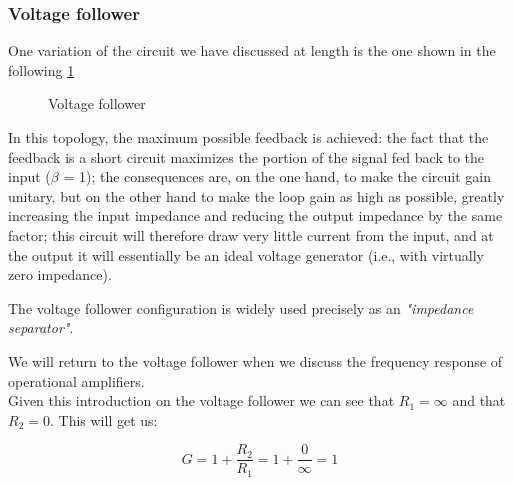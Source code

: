 \documentclass[../main.tex]{subfiles}
\begin{document}
\subsubsection{Voltage follower}

One variation of the circuit we have discussed at length is the one shown in the following \ref{ex6}

\begin{figure}[h!]
\begin{center}


\caption{Voltage follower}	
\label{ex6}
\end{center}	
\end{figure}


In this topology, the maximum possible feedback is achieved: the fact that the feedback is a short circuit maximizes the portion of the signal fed back to the input ($\beta$ = 1); the consequences are, on the one hand, to make the circuit gain unitary, but on the other hand to make the loop gain as high as possible, greatly increasing the input impedance and reducing the output impedance by the same factor; this circuit will therefore draw very little current from the input, and at the output it will essentially be an ideal voltage generator (i.e., with virtually zero impedance).

The voltage follower configuration is widely used precisely as an \textit{"impedance separator"}. 

We will return to the voltage follower when we discuss the frequency response of operational amplifiers.\\

Given this introduction on the voltage follower we can see that $R_1 = \infty$ and that $R_2 = 0$. This will get us:

\begin{equation}
	G = 1 + \frac{R_2}{R_1} = 1 + \frac{0}{\infty} = 1
\end{equation}
\end{document}
